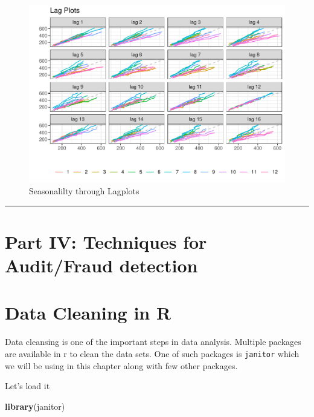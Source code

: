 \documentclass[
]{book}
\newenvironment{Shaded}{\begin{snugshade}}{\end{snugshade}}
\newcommand{\FunctionTok}[1]{\textcolor[rgb]{0.13,0.29,0.53}{\textbf{#1}}}
\newcommand{\NormalTok}[1]{#1}
\begin{document}
\begin{figure}

{\centering \includegraphics{DauR_files/figure-latex/lagp-1} 

}

\caption{Seasonalilty through Lagplots}\label{fig:lagp}
\end{figure}

\begin{center}\rule{0.5\linewidth}{0.5pt}\end{center}

\hypertarget{part-iv-techniques-for-auditfraud-detection}{%
\chapter*{Part IV: Techniques for Audit/Fraud detection}\label{part-iv-techniques-for-auditfraud-detection}}

\hypertarget{data-cleaning-in-r}{%
\chapter{Data Cleaning in R}\label{data-cleaning-in-r}}

Data cleansing is one of the important steps in data analysis. Multiple packages are available in r to clean the data sets. One of such packages is \texttt{janitor} which we will be using in this chapter along with few other packages.

Let's load it

\begin{Shaded}
\begin{Highlighting}[]
\FunctionTok{library}\NormalTok{(janitor)}
\end{Highlighting}
\end{Shaded}
\end{document}
